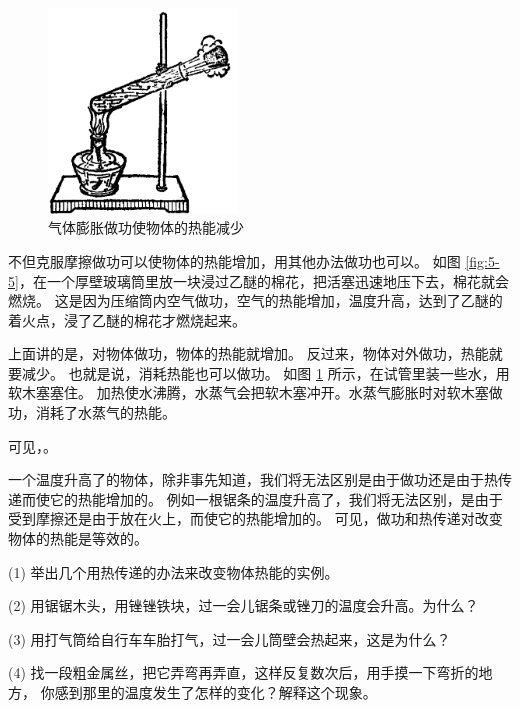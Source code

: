 \begin{figure}
    \centering
    \includegraphics[width=5cm]{../pic/czwl2-ch5-6}
    \caption{气体膨胀做功使物体的热能减少}\label{fig:5-6}
\end{figure}

不但克服摩擦做功可以使物体的热能增加，用其他办法做功也可以。
如图 \ref{fig:5-5}，在一个厚壁玻璃筒里放一块浸过乙醚的棉花，把活塞迅速地压下去，棉花就会燃烧。
这是因为压缩筒内空气做功，空气的热能增加，温度升高，达到了乙醚的着火点，浸了乙醚的棉花才燃烧起来。

上面讲的是，对物体做功，物体的热能就增加。
反过来，物体对外做功，热能就要减少。
也就是说，消耗热能也可以做功。
如图 \ref{fig:5-6} 所示，在试管里装一些水，用软木塞塞住。
加热使水沸腾，水蒸气会把软木塞冲开。水蒸气膨胀时对软木塞做功，消耗了水蒸气的热能。

可见，。

一个温度升高了的物体，除非事先知道，我们将无法区别是由于做功还是由于热传递而使它的热能增加的。
例如一根锯条的温度升高了，我们将无法区别，是由于受到摩擦还是由于放在火上，而使它的热能增加的。
可见，做功和热传递对改变物体的热能是等效的。



\lianxi

(1) 举出几个用热传递的办法来改变物体热能的实例。

(2) 用锯锯木头，用锉锉铁块，过一会儿锯条或锉刀的温度会升高。为什么？

(3) 用打气筒给自行车车胎打气，过一会儿筒壁会热起来，这是为什么？

(4) 找一段粗金属丝，把它弄弯再弄直，这样反复数次后，用手摸一下弯折的地方，
你感到那里的温度发生了怎样的变化？解释这个现象。

